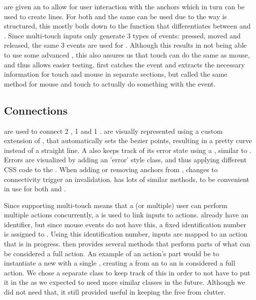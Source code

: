  are given an  to allow for user interaction with the anchors which in turn can be used to create lines. For both  and  the same  can be used due to the way  is structured, this mostly boils down to the function  that differentiates between  and . Since multi-touch inputs only generate 3 types of events: pressed, moved and released, the same 3 events are used for . Although this results in not being able to use some advanced , this also assures us that touch can do the same as mouse, and thus allows easier testing.  first catches the event and extracts the necessary information for touch and mouse in separate sections, but called the same method for mouse and touch to actually do something with the event.

\subsection{Connections}
 are used to connect 2 , 1  and 1 .  are visually represented using a custom extension of , that automatically sets the bezier points, resulting in a pretty curve instead of a straight line. A  also keeps track of its error state using a , similar to . Errors are visualized by adding an 'error' style class, and thus applying different CSS code to the . When adding or removing anchors from , changes to connectivity trigger an invalidation.  has lots of similar methods, to be convenient in use for both  and .

Since supporting multi-touch means that a (or multiple) user can perform multiple actions concurrently, a  is used to link inputs to actions.  already have an identifier, but since mouse events do not have this, a fixed identification number is assigned to . Using this identification number, inputs are mapped to an action that is in progress.  then provides several methods that perform parts of what can be considered a full action. An example of an action's part would be to instantiate a new  with a single , creating a  from an  to an  is considered a full action. We chose a separate class to keep track of this in order to not have to put it in the  as we expected to need more similar classes in the future. Although we did not need that, it still provided useful in keeping the  free from clutter.

